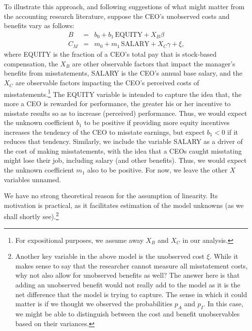 To illustrate this approach, and following suggestions of what might matter from the
accounting research literature, suppose the CEO's unobserved costs and benefits vary as follows:
%
\begin{equation}
\begin{array}{lcl}\label{eqns1}
B & = & b_0 + b_1 \, \mbox{EQUITY} + X_B\beta\\[.5em]
C_M & = & m_0 + m_1 \, \mbox{SALARY} + X_C\gamma + \xi \text{,} %
\end{array}
\end{equation}
where EQUITY is the fraction of a CEO's total pay that is stock-based compensation, 
the $X_B$ are other observable factors that impact the manager's benefits from misstatements,
SALARY is the CEO's annual base salary, and the $X_C$ are observable factors impacting the CEO's perceived costs of misstatements.\footnote{
For expositional purposes, we assume away $X_B$ and $X_C$ in our analysis.}
The EQUITY variable is intended to capture the idea that, the more a CEO is rewarded for performance, the greater his or her incentive to misstate results so as to increase (perceived) performance.
Thus, we would expect the unknown coefficient $b_1$ to be positive if providing more equity incentives increases the tendency of the CEO to misstate earnings, but expect $b_1 < 0$ if it reduces that tendency.
Similarly, we include the variable SALARY as a driver of the cost of making misstatements, with the idea that a CEOs caught misstating might lose their job, including salary (and other benefits).
Thus, we would expect the unknown coefficient $m_1$ also to be positive.
For now, we leave the other $X$ variables unnamed.

We have no strong theoretical reason for the assumption of linearity. Its motivation is practical, as it facilitates estimation of the model unknowns (as we shall shortly see).\footnote{Another key variable in the above model is the unobserved cost $\xi$.
While it makes sense to say that the researcher cannot measure all misstatement costs, why not also allow for unobserved benefits as well?
The answer here is that adding an unobserved benefit would not really add to the model as it is the net difference that the model is trying to capture.
The sense in which it could matter is if we thought we observed the probabilities $p_A$ and $p_I$.
In this case, we might be able to distinguish between the cost and benefit unobservables based on their variances.}
 
